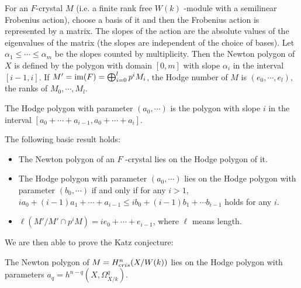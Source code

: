 \begin{definition}
    For an $F$-crystal $M$ 
    (i.e. a finite rank free $W(k)$ -module with a semilinear Frobenius action), 
    choose a basis of it and then the Frobenius action is represented by a matrix. 
    The slopes of the action are the absolute values of the eigenvalues of the matrix 
    (the slopes are independent of the choice of bases). 
    Let $\alpha_1 \leq \cdots \leq \alpha_m$ be the slopes counted by multiplicity. 
    Then the Newton polygon of $X$ is defined by the polygon with domain $[0, m]$ 
    with slope $\alpha_i$ in the interval $[i - 1, i]$. 
    If $M' = \operatorname{im}(F) = \bigoplus_{i = 0}^l p^i M_i$, 
    the Hodge number of $M$ is $(e_0, \cdots, e_l)$, 
    the ranks of $M_0, \cdots, M_l$.
\end{definition}

\begin{definition}
    The Hodge polygon with parameter $(a_0, \cdots)$ is the polygon 
    with slope $i$ in the interval $[a_0 + \cdots + a_{i-1}, a_0 + \cdots + a_i]$.
\end{definition}

\begin{lemma}
    The following basic result holds:
    \begin{itemize}
        \item 
            The Newton polygon of an $F$ -crystal lies on the Hodge polygon of it.
        \item 
            The Hodge polygon with parameter $(a_0, \cdots)$ lies on the Hodge polygon 
            with parameter $(b_0, \cdots)$ if and only if for any $i>1$, 
            $i a_0 + (i - 1) a_1 + \cdots + a_{i-1} 
            \leq i b_0 + (i - 1) b_1 + \cdots b_{i - 1}$ 
            holds for any $i$.
        \item 
            $\ell(M'/M' \cap p^i M) = i e_0 + \cdots + e_{i - 1}$, 
            where $\ell$ means length.
    \end{itemize}
\end{lemma}

We are then able to prove the Katz conjecture:
\begin{theorem}
The Newton polygon of $M = H^n_{cris}(X/W(k))$ lies on the Hodge polygon 
with parameters $a_q = h^{n-q}(X, \Omega_{X/k}^q)$. 
\end{theorem}

